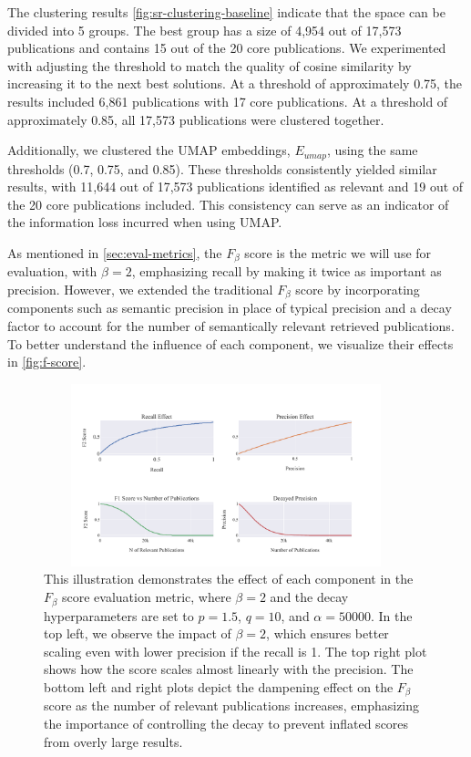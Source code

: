 The clustering results \autoref{fig:sr-clustering-baseline} indicate that the space can be divided into 5 groups. The best group has a size of 4,954 out of 17,573 publications and contains 15 out of the 20 core publications. We experimented with adjusting the threshold to match the quality of cosine similarity by increasing it to the next best solutions. At a threshold of approximately 0.75, the results included 6,861 publications with 17 core publications. At a threshold of approximately 0.85, all 17,573 publications were clustered together.

Additionally, we clustered the UMAP embeddings, $E_{umap}$, using the same thresholds (0.7, 0.75, and 0.85). These thresholds consistently yielded similar results, with 11,644 out of 17,573 publications identified as relevant and 19 out of the 20 core publications included. This consistency can serve as an indicator of the information loss incurred when using UMAP.

As mentioned in \autoref{sec:eval-metrics}, the $F_{\beta}$ score is the metric we will use for evaluation, with $\beta=2$, emphasizing recall by making it twice as important as precision. However, we extended the traditional $F_{\beta}$ score by incorporating components such as semantic precision in place of typical precision and a decay factor to account for the number of semantically relevant retrieved publications. To better understand the influence of each component, we visualize their effects in \autoref{fig:f-score}.

\begin{figure}
	\includegraphics[width=400px, height=200px]{pics/f_score.pdf}
	\caption[$F_{\beta}$ Components Analysis]{This illustration demonstrates the effect of each component in the $F_{\beta}$ score evaluation metric, where $\beta=2$ and the decay hyperparameters are set to $p=1.5$, $q=10$, and $\alpha=50000$. In the top left, we observe the impact of $\beta=2$, which ensures better scaling even with lower precision if the recall is 1. The top right plot shows how the score scales almost linearly with the precision. The bottom left and right plots depict the dampening effect on the $F_{\beta}$ score as the number of relevant publications increases, emphasizing the importance of controlling the decay to prevent inflated scores from overly large results.}\label{fig:f-score}
\end{figure}

